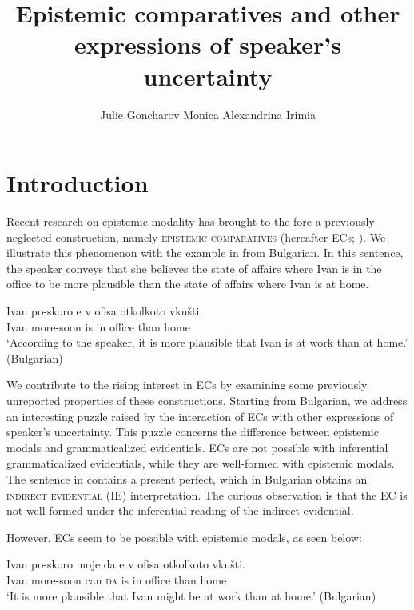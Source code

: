 \documentclass[output=paper,
]{langscibook}
\title{Epistemic comparatives and other expressions of speaker's uncertainty}
\author{
Julie Goncharov\affiliation{Hebrew University of Jerusalem / University of Göttingen}\lastand
Monica Alexandrina Irimia\affiliation{University of Modena and Reggio Emilia}\orcid{0000-0003-3733-8163}
}
\begin{document}
\maketitle%
\section{Introduction}\label{sect:intro}

Recent research on epistemic modality has brought to the fore a previously neglected construction, namely \textsc{epistemic comparatives} (hereafter ECs; \citealt{finkra14,herrub14}). We illustrate this phenomenon with the example in  from Bulgarian. In this sentence, the speaker conveys that she believes the state of affairs where Ivan is in the office to be more plausible than the state of affairs where Ivan is at home.			

	\ea \gll Ivan	po-skoro	e 	v	ofisa	otkolkoto vkušti.\\		
	Ivan more-soon	is	in	office	than home \\ 
      \glt `According to the speaker, it is more plausible that Ivan is at work than at home.'	\hfill (Bulgarian)	  \label{BulgEC}
        \z

\noindent We contribute to the rising interest in ECs by examining some previously unreported properties of these constructions. Starting from Bulgarian, we address an interesting puzzle raised by the interaction of ECs with other expressions of speaker's uncertainty. This puzzle  concerns the difference between epistemic modals and grammaticalized evidentials. ECs are not possible with inferential grammaticalized evidentials, while they are well-formed with epistemic modals. The sentence in  contains a present perfect, which in Bulgarian obtains an \textsc{indirect evidential} (IE) interpretation. The curious observation is that the EC is not well-formed under the inferential reading of the indirect evidential.


 	\z   

\noindent However, ECs seem to be possible with epistemic modals, as seen below: 

	\ea \gll Ivan po-skoro moje da e v ofisa otkolkoto vkušti.\\		
	Ivan	more-soon can \textsc{da} is in	office than home \\  
        \glt `It is more plausible that Ivan might be at work than at home.' \hfill (Bulgarian)
        \z
\end{document}
